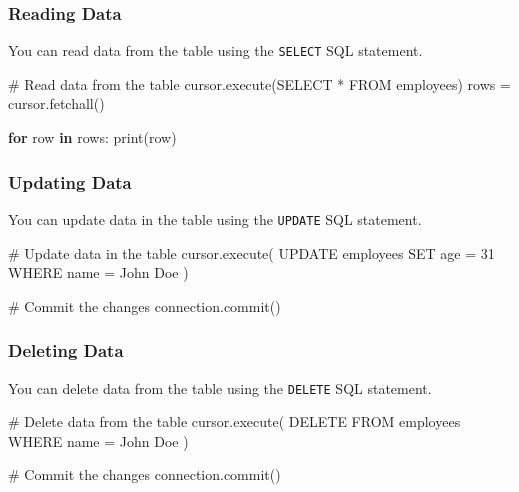 \documentclass[
  letterpaper,
  DIV=11,
  numbers=noendperiod]{scrreprt}
\newenvironment{Shaded}{\begin{snugshade}}{\end{snugshade}}
\newcommand{\BuiltInTok}[1]{\textcolor[rgb]{0.00,0.23,0.31}{#1}}
\newcommand{\CommentTok}[1]{\textcolor[rgb]{0.37,0.37,0.37}{#1}}
\newcommand{\ControlFlowTok}[1]{\textcolor[rgb]{0.00,0.23,0.31}{\textbf{#1}}}
\newcommand{\KeywordTok}[1]{\textcolor[rgb]{0.00,0.23,0.31}{\textbf{#1}}}
\newcommand{\NormalTok}[1]{\textcolor[rgb]{0.00,0.23,0.31}{#1}}
\newcommand{\OperatorTok}[1]{\textcolor[rgb]{0.37,0.37,0.37}{#1}}
\newcommand{\StringTok}[1]{\textcolor[rgb]{0.13,0.47,0.30}{#1}}
\begin{document}
\subsubsection{Reading Data}\label{reading-data}

You can read data from the table using the \texttt{SELECT} SQL
statement.

\begin{Shaded}
\begin{Highlighting}[]
\CommentTok{\# Read data from the table}
\NormalTok{cursor.execute(}\StringTok{\textquotesingle{}SELECT * FROM employees\textquotesingle{}}\NormalTok{)}
\NormalTok{rows }\OperatorTok{=}\NormalTok{ cursor.fetchall()}

\ControlFlowTok{for}\NormalTok{ row }\KeywordTok{in}\NormalTok{ rows:}
    \BuiltInTok{print}\NormalTok{(row)}
\end{Highlighting}
\end{Shaded}

\subsubsection{Updating Data}\label{updating-data}

You can update data in the table using the \texttt{UPDATE} SQL
statement.

\begin{Shaded}
\begin{Highlighting}[]
\CommentTok{\# Update data in the table}
\NormalTok{cursor.execute(}\StringTok{\textquotesingle{}\textquotesingle{}\textquotesingle{}}
\StringTok{UPDATE employees}
\StringTok{SET age = 31}
\StringTok{WHERE name = \textquotesingle{}John Doe\textquotesingle{}}
\StringTok{\textquotesingle{}\textquotesingle{}\textquotesingle{}}\NormalTok{)}

\CommentTok{\# Commit the changes}
\NormalTok{connection.commit()}
\end{Highlighting}
\end{Shaded}

\subsubsection{Deleting Data}\label{deleting-data}

You can delete data from the table using the \texttt{DELETE} SQL
statement.

\begin{Shaded}
\begin{Highlighting}[]
\CommentTok{\# Delete data from the table}
\NormalTok{cursor.execute(}\StringTok{\textquotesingle{}\textquotesingle{}\textquotesingle{}}
\StringTok{DELETE FROM employees}
\StringTok{WHERE name = \textquotesingle{}John Doe\textquotesingle{}}
\StringTok{\textquotesingle{}\textquotesingle{}\textquotesingle{}}\NormalTok{)}

\CommentTok{\# Commit the changes}
\NormalTok{connection.commit()}
\end{Highlighting}
\end{Shaded}
\end{document}

